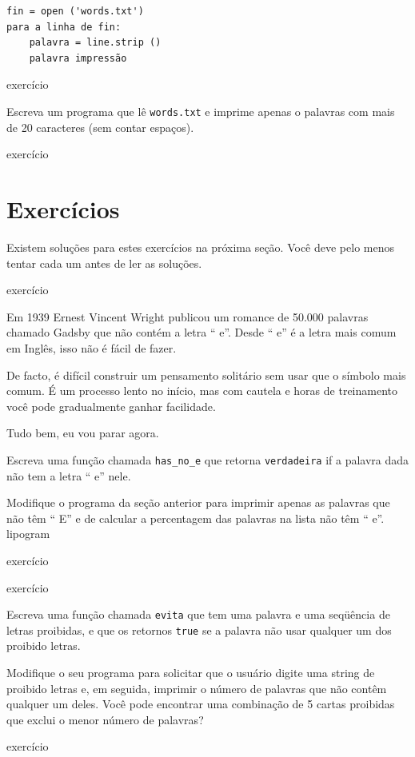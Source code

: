 \documentclass[10pt]{book}
\begin{document}
\begin{verbatim}
fin = open ('words.txt')
para a linha de fin:
    palavra = line.strip ()
    palavra impressão
\end{verbatim}
%

\begin{} exercício

Escreva um programa que lê {\tt words.txt} e imprime apenas o
palavras com mais de 20 caracteres (sem contar espaços).

\end{} exercício


\section{Exercícios}

Existem soluções para estes exercícios na próxima seção.
Você deve pelo menos tentar cada um antes de ler as soluções.

\begin{} exercício

Em 1939 Ernest Vincent Wright publicou um romance de 50.000 palavras chamado
{\Em Gadsby} que não contém a letra `` e''. Desde `` e'' é
a letra mais comum em Inglês, isso não é fácil de fazer.

De facto, é difícil construir um pensamento solitário sem usar
que o símbolo mais comum. É um processo lento no início, mas com cautela
e horas de treinamento você pode gradualmente ganhar facilidade.

Tudo bem, eu vou parar agora.

Escreva uma função chamada \verb "has_no_e" que retorna {\tt verdadeira} if
a palavra dada não tem a letra `` e'' nele.

Modifique o programa da seção anterior para imprimir apenas as palavras
que não têm `` E'' e de calcular a percentagem das palavras na lista
não têm `` e''.
\index{} lipogram

\end{} exercício


\begin{} exercício 

Escreva uma função chamada {\tt evita}
que tem uma palavra e uma seqüência de letras proibidas, e
que os retornos {\tt true} se a palavra não usar qualquer um dos proibido
letras.

Modifique o seu programa para solicitar que o usuário digite uma string
de proibido letras e, em seguida, imprimir o número de palavras que
não contêm qualquer um deles.
Você pode encontrar uma combinação de 5 cartas proibidas que
exclui o menor número de palavras?

\end{} exercício
\end{document}
